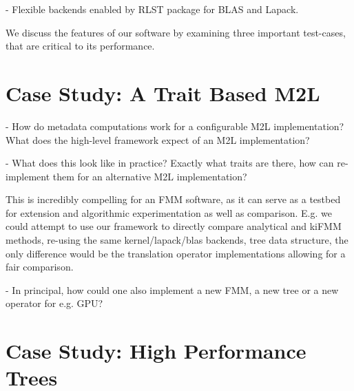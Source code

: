 - Flexible backends enabled by RLST package for BLAS and Lapack.

We discuss the features of our software by examining three important test-cases, that are critical to its performance.

\section{Case Study: A Trait Based M2L}\label{chpt:software_design:sec:m2l}

- How do metadata computations work for a configurable M2L implementation? What does the high-level framework expect of an M2L implementation?

- What does this look like in practice? Exactly what traits are there, how can re-implement them for an alternative M2L implementation?

This is incredibly compelling for an FMM software, as it can serve as a testbed for extension and algorithmic experimentation as well as comparison. E.g. we could attempt to use our framework to directly compare analytical and kiFMM methods, re-using the same kernel/lapack/blas backends, tree data structure, the only difference would be the translation operator implementations allowing for a fair comparison.

- In principal, how could one also implement a new FMM, a new tree or a new operator for e.g. GPU?

\section{Case Study: High Performance Trees}\label{chpt:software_design:sec:trees}

